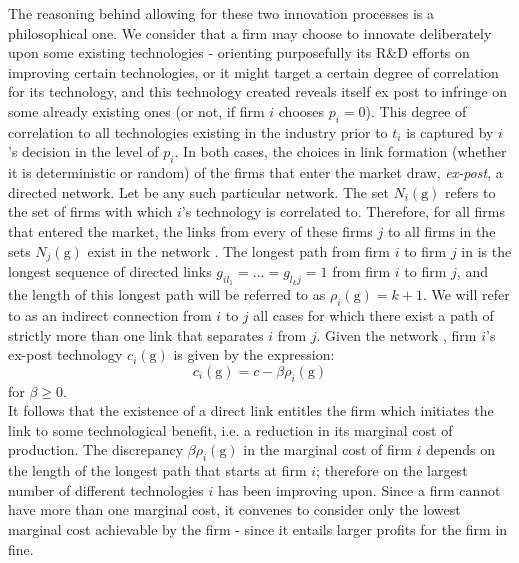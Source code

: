 \documentclass[11pt]{article}
\begin{document}
\indent The reasoning behind allowing for these two innovation processes is a philosophical one. We consider that a firm may choose to innovate deliberately upon some existing technologies - orienting purposefully its R\&D efforts on improving certain technologies, or it might target a certain degree of correlation for its technology, and this technology created reveals itself ex post to infringe on some already existing ones (or not, if firm $i$ chooses $p_i=0$). This degree of correlation to all technologies existing in the industry prior to $t_i$ is captured by $i$'s decision in the level of $p_i$. In both cases, the choices in link formation (whether it is deterministic or random) of the firms that enter the market draw, \textit{ex-post}, a directed network. Let  be any such particular network. The set $N_i(\text{g})$ refers to the set of firms with which $i$'s technology is correlated to. Therefore, for all firms that entered the market, the links from every of these firms $j$ to all firms in the sets $N_j(\text{g})$ exist in the network . The longest path from firm $i$ to firm $j$ in  is the longest sequence of directed links $g_{i l_1}=...=g_{l_k j}=1$ from firm $i$ to firm $j$, and the length of this longest path will be referred to as $\rho_i(\text{g})=k+1$. We will refer to as an indirect connection from $i$ to $j$ all cases for which there exist a path of strictly more than one link that separates $i$ from $j$. Given the network , firm $i$'s ex-post technology $c_i(\text{g})$ is given by the expression:
\begin{equation}
c_i(\text{g})=c-\beta \rho_i(\text{g})
\end{equation}
for $\beta \geq 0$. \\
\indent It follows that the existence of a direct link entitles the firm which initiates the link to some technological benefit, i.e. a reduction in its marginal cost of production. The discrepancy $\beta \rho_i(\text{g})$ in the marginal cost of firm $i$ depends on the length of the longest path that starts at firm $i$; therefore on the largest number of different technologies $i$ has been improving upon. Since a firm cannot have more than one marginal cost, it convenes to consider only the lowest marginal cost achievable by the firm - since it entails larger profits for the firm in fine. \\
\end{document}
